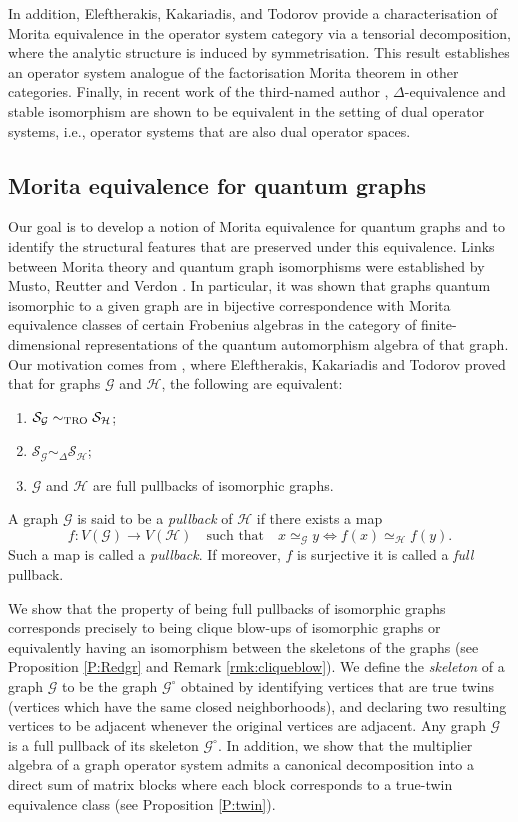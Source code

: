 \documentclass[11pt]{amsart}
\numberwithin{equation}{section}
\theoremstyle{plain}
\theoremstyle{definition}
\theoremstyle{remark}
\newcommand{\G}{{\mathcal{G}}}
\renewcommand{\H}{{\mathcal{H}}}
\renewcommand{\S}{{\mathcal{S}}}
\begin{document}
In addition, Eleftherakis, Kakariadis, and Todorov \cite{EKT25} provide a characterisation of Morita equivalence in the operator system category via a tensorial decomposition, where the analytic structure is induced by symmetrisation. This result establishes an operator system analogue of the factorisation Morita theorem in other categories.
Finally, in recent work of the third-named author \cite{Kou25}, $\Delta$-equivalence and stable isomorphism are shown to be equivalent in the setting of dual operator systems, i.e., operator systems that are also dual operator spaces.

\subsection{Morita equivalence for quantum graphs}
Our goal is to develop a notion of Morita equivalence for quantum graphs and to identify the structural features that are preserved under this equivalence. Links between Morita theory and quantum graph isomorphisms were established by Musto, Reutter and Verdon \cite{MRV19}. In particular, it was shown that graphs quantum isomorphic to a given graph are in bijective correspondence with Morita equivalence classes of certain Frobenius algebras in the category of finite-dimensional representations of the quantum automorphism algebra of that graph. Our motivation comes from \cite[Corollary 7.6]{EKT21}, where Eleftherakis, Kakariadis and Todorov proved that for graphs $\G$ and $\H$,  the following are equivalent:
\begin{enumerate}
\item $\S_{\G} \sim_{\rm TRO} \S_{\H}$;
\item $\S_{\G} \sim_{\Delta} \S_{\H}$;
\item $\G$ and $\H$ are full pullbacks of isomorphic graphs.
\end{enumerate}

A graph $\G$ is said to be a \emph{pullback} of $\H$ if there exists a map
\[
f \colon V(\G)\to V(\H) \quad \text{such that} \quad  x \simeq_{\G} y \iff f(x) \simeq_{\H} f(y).
\]
Such a map is called a \emph{pullback}. If moreover, $f$ is surjective 
it is called a \emph{full} pullback.

We show that the property of being full pullbacks of isomorphic graphs corresponds precisely to being clique blow-ups of isomorphic graphs or equivalently having an isomorphism between the skeletons of the graphs (see Proposition \ref{P:Redgr} and Remark \ref{rmk:cliqueblow}). We define the \emph{skeleton} of a graph $\G$ to be the graph $\G^\circ$ obtained by identifying vertices that are true twins (vertices which have the same closed neighborhoods), and declaring two resulting vertices to be adjacent whenever the original vertices are adjacent. Any graph $\G$ is a full pullback of its skeleton $\G^\circ$. In addition, we show that the multiplier algebra  of a graph operator system admits a canonical decomposition into a direct sum of matrix blocks where each block corresponds to a true-twin equivalence class (see Proposition \ref{P:twin}). 
\end{document}
